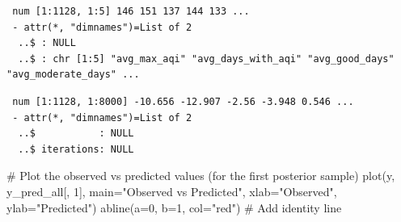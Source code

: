 \documentclass[
  12pt,
]{article}
\newenvironment{Shaded}{\begin{snugshade}}{\end{snugshade}}
\newcommand{\AttributeTok}[1]{\textcolor[rgb]{0.40,0.45,0.13}{#1}}
\newcommand{\CommentTok}[1]{\textcolor[rgb]{0.37,0.37,0.37}{#1}}
\newcommand{\ControlFlowTok}[1]{\textcolor[rgb]{0.00,0.23,0.31}{\textbf{#1}}}
\newcommand{\DecValTok}[1]{\textcolor[rgb]{0.68,0.00,0.00}{#1}}
\newcommand{\FunctionTok}[1]{\textcolor[rgb]{0.28,0.35,0.67}{#1}}
\newcommand{\NormalTok}[1]{\textcolor[rgb]{0.00,0.23,0.31}{#1}}
\newcommand{\OtherTok}[1]{\textcolor[rgb]{0.00,0.23,0.31}{#1}}
\newcommand{\SpecialCharTok}[1]{\textcolor[rgb]{0.37,0.37,0.37}{#1}}
\newcommand{\StringTok}[1]{\textcolor[rgb]{0.13,0.47,0.30}{#1}}
\begin{document}
\begin{Shaded}
\end{Shaded}

\begin{verbatim}
 num [1:1128, 1:5] 146 151 137 144 133 ...
 - attr(*, "dimnames")=List of 2
  ..$ : NULL
  ..$ : chr [1:5] "avg_max_aqi" "avg_days_with_aqi" "avg_good_days" "avg_moderate_days" ...
\end{verbatim}

\begin{Shaded}
\end{Shaded}

\begin{verbatim}
 num [1:1128, 1:8000] -10.656 -12.907 -2.56 -3.948 0.546 ...
 - attr(*, "dimnames")=List of 2
  ..$           : NULL
  ..$ iterations: NULL
\end{verbatim}

\begin{Shaded}
\begin{Highlighting}[]
\CommentTok{\# Plot the observed vs predicted values (for the first posterior sample)}
\FunctionTok{plot}\NormalTok{(y, y\_pred\_all[, }\DecValTok{1}\NormalTok{], }\AttributeTok{main=}\StringTok{"Observed vs Predicted"}\NormalTok{, }\AttributeTok{xlab=}\StringTok{"Observed"}\NormalTok{, }\AttributeTok{ylab=}\StringTok{"Predicted"}\NormalTok{)}
\FunctionTok{abline}\NormalTok{(}\AttributeTok{a=}\DecValTok{0}\NormalTok{, }\AttributeTok{b=}\DecValTok{1}\NormalTok{, }\AttributeTok{col=}\StringTok{"red"}\NormalTok{)  }\CommentTok{\# Add identity line}
\end{Highlighting}
\end{Shaded}
\end{document}
